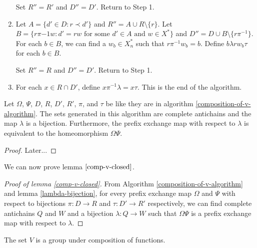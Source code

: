 \documentclass[12pt]{amsart}
\newcommand{\xns}{X_n^*}
\begin{document}
\begin{algorithm}
\begin{enumerate}[label=Step \arabic*:]
                Set $R'' = R'$ and $D'' = D'$. Return to Step 1.
                
                
                \item\label{r-prefix-2} Let $A = \{d' \in D : r \prec d'\}$ and $R'' = A \cup R \setminus \{r\}$. Let $B = \{r\pi{-1} w : d' = rw \text{ for some } d' \in A \text{ and } w \in X^*\}$ and $D'' = D \cup B \setminus \{r \pi^{-1}\}$. For each $b \in B$, we can find a $w_b \in \xns$ such that $r \pi^{-1} w_b = b$. Define $b \lambda rw_b \tau$ for each $b \in B$.
                
                Set $R'' = R$ and $D'' = D'$. Return to Step 1.
                
                \item\label{final-step} For each $x \in R \cap D'$, define $x\pi^{-1} \lambda = x\tau$. This is the end of the algorithm.
            \end{enumerate}
              
        \end{algorithm}
        
        \begin{lemma}\label{lambda-bijection}
            Let $\Omega$, $\Psi$, $D$, $R$, $D'$, $R'$, $\pi$, and $\tau$ be like they are in algorithm \ref{composition-of-v-algorithm}. The sets generated in this algorithm are complete antichains and the map $\lambda$ is a bijection. Furthermore, the prefix exchange map with respect to $\lambda$ is equivalent to the homeomorphism $\Omega\Psi$.
        \end{lemma}
        
        \begin{proof}
            Later...
        \end{proof}
        
        We can now prove lemma $\ref{comp-v-closed}$.
        
        \begin{proof}[Proof of lemma \ref{comp-v-closed}]
            From Algorithm \ref{composition-of-v-algorithm} and lemma \ref{lambda-bijection}, for every prefix exchange map $\Omega$ and $\Psi$ with respect to bijections $\pi : D \to R$ and $\tau : D' \to R'$ respectively, we can find complete antichains $Q$ and $W$ and a bijection $\lambda : Q \to W$ such that $\Omega\Psi$ is a prefix exchange map with respect to $\lambda$. 
        \end{proof}
        
        \begin{lemma}
            The set $V$ is a group under composition of functions.
        \end{lemma}
        
\end{document}

